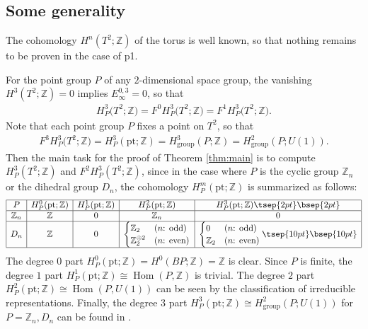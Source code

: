 \documentclass[pdftex]{sigma}
\theoremstyle{definition}
\newcommand{\Z}{\mathbb{Z}}
\newcommand{\pt}{\mathrm{pt}}
\begin{document}
\subsection{Some generality}\label{subsec:some_generality}

The cohomology $H^n(T^2; \Z)$ of the torus is well known, so that nothing remains to be proven in the case of \textsf{p1}.

For the point group $P$ of any $2$-dimensional space group, the vanishing $H^3(T^2; \Z) = 0$ implies $E^{0, 3}_\infty = 0$, so that
\begin{gather*}
H^3_P\big(T^2; \Z\big) = F^0H^3_P\big(T^2; \Z\big) = F^1H^3_P\big(T^2; \Z\big).
\end{gather*}
Note that each point group $P$ f\/ixes a point on $T^2$, so that
\begin{gather*}
F^3H^3_P\big(T^2; \Z\big) = H^3_P(\pt; \Z)= H^3_{\mathrm{group}}(P; \Z)= H^2_{\mathrm{group}}(P; U(1)).
\end{gather*}
Then the main task for the proof of Theorem \ref{thm:main} is to compute $H^3_P(T^2; \Z)$ and $F^2H^3_P(T^2; \Z)$, since in the case where $P$ is the cyclic group $\Z_n$ or the dihedral group $D_n$, the cohomology $H^m_P(\pt; \Z)$ is summarized as follows:
$$
\begin{array}{|c|c|c|c|c|}
\hline
P & H^0_P(\pt; \Z) & H^1_P(\pt; \Z) & H^2_P(\pt; \Z) & H^3_P(\pt; \Z) \tsep{2pt}\bsep{2pt}\\
\hline
\Z_n & \Z & 0 & \Z_n & 0 \\
\hline
D_n & \Z & 0 &
\begin{cases}
\Z_2 & (\mbox{$n$: odd}) \\
\Z_2^{\oplus 2} & (\mbox{$n$: even})
\end{cases} &
\begin{cases}
0 & (\mbox{$n$: odd}) \\
\Z_2 & (\mbox{$n$: even})
\end{cases}\tsep{10pt}\bsep{10pt}\\
\hline
\end{array}
$$
The degree $0$ part $H^0_P(\pt; \Z) = H^0(BP; \Z) = \Z$ is clear. Since $P$ is f\/inite, the degree $1$ part $H^1_P(\pt; \Z) \cong \operatorname{Hom}(P, \Z)$ is trivial. The degree $2$ part $H^2_P(\pt; \Z) \cong \operatorname{Hom}(P, U(1))$ can be seen by the classif\/ication of irreducible representations. Finally, the degree $3$ part $H^3_P(\pt; \Z) \cong H^2_{\mathrm{group}}(P; U(1))$ for $P = \Z_n, D_n$ can be found in \cite{Ka}.
\end{document}
